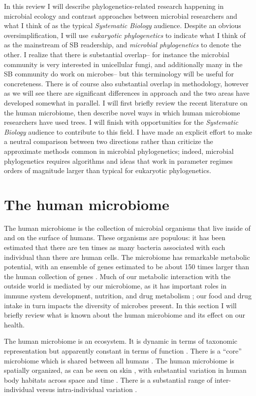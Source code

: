 \documentclass{amsart}
\begin{document}
In this review I will describe phylogenetics-related research happening in microbial ecology and contrast approaches between microbial researchers and what I think of as the typical \emph{Systematic Biology} audience.
Despite an obvious oversimplification, I will use \textit{eukaryotic phylogenetics} to indicate what I think of as the mainstream of SB readership, and \textit{microbial phylogenetics} to denote the other.
I realize that there is substantial overlap-- for instance the microbial community is very interested in unicellular fungi, and additionally many in the SB community do work on microbes-- but this terminology will be useful for concreteness.
There is of course also substantial overlap in methodology, however as we will see there are significant differences in approach and the two areas have developed somewhat in parallel.
I will first briefly review the recent literature on the human microbiome, then describe novel ways in which human microbiome researchers have used trees.
I will finish with opportunities for the \textit{Systematic Biology} audience to contribute to this field.
I have made an explicit effort to make a neutral comparison between two directions rather than criticize the approximate methods common in microbial phylogenetics; indeed, microbial phylogenetics requires algorithms and ideas that work in parameter regimes orders of magnitude larger than typical for eukaryotic phylogenetics.

\section{The human microbiome}
The human microbiome is the collection of microbial organisms that live inside of and on the surface of humans.
These organisms are populous: it has been estimated that there are ten times as many bacteria associated with each individual than there are human cells.
The microbiome has remarkable metabolic potential, with an ensemble of genes estimated to be about 150 times larger than the human collection of genes \citep{qin2010human}.
Much of our metabolic interaction with the outside world is mediated by our microbiome, as it has important roles in immune system development, nutrition, and drug metabolism \citep{kau2011human,maurice2013xenobiotics}; our food and drug intake in turn impacts the diversity of microbes present.
In this section I will briefly review what is known about the human microbiome and its effect on our health.

The human microbiome is an ecosystem.
It is dynamic in terms of taxonomic representation but apparently constant in terms of function \citep{hmp2012structure}.
There is a ``core'' microbiome which is shared between all humans \citep{turnbaugh2008core}.
The human microbiome is spatially organized, as can be seen on skin \citep{grice2009topographical}, with substantial variation in human body habitats across space and time \citep{costello2009bacterial}.
There is a substantial range of inter-individual versus intra-individual variation \citep{hmp2012structure}.
\end{document}
